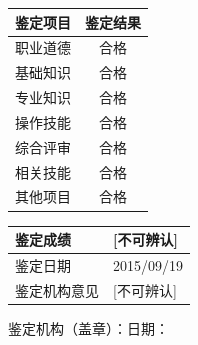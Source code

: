 \documentclass[UTF8,10pt,a4paper,fontset=fandol]{ctexart}
\newcommand{\fieldvalue}[1]{#1}
\newcommand{\handwritten}[1]{#1}
\begin{document}
\begin{tabularx}{\textwidth}{|X|c|}
\hline
鉴定项目 & 鉴定结果 \\
\hline
职业道德 & \fieldvalue{\handwritten{\checkmark}} 合格 \\
\hline
基础知识 & \fieldvalue{\handwritten{\checkmark}} 合格 \\
\hline
专业知识 & \fieldvalue{\handwritten{\checkmark}} 合格 \\
\hline
操作技能 & \fieldvalue{\handwritten{\checkmark}} 合格 \\
\hline
综合评审 & \fieldvalue{\handwritten{\checkmark}} 合格 \\
\hline
相关技能 & \fieldvalue{\handwritten{\checkmark}} 合格 \\
\hline
其他项目 & \fieldvalue{\handwritten{\checkmark}} 合格 \\
\hline
\end{tabularx}

\vspace{0.5em}

\begin{tabularx}{\textwidth}{|l|X|}
\hline
鉴定成绩 &
\fieldvalue{\handwritten{[不可辨认]}} \\
\hline
鉴定日期 &
\fieldvalue{\handwritten{2015/09/19}} \\
\hline
鉴定机构意见 &
\fieldvalue{\handwritten{[不可辨认]}} \\
\hline
\end{tabularx}

\vspace{0.5em}

\noindent
鉴定机构（盖章）：\hfill 日期：\underline{\hspace{3cm}}
\end{document}
